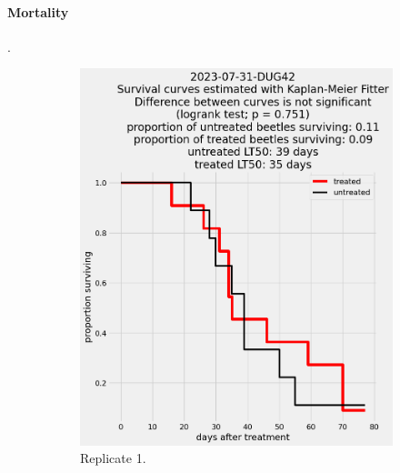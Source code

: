 \documentclass[12pt,letterpaper,english,bibliography=totocnumbered, abstract=on]{scrartcl}
\begin{document}
\paragraph{Mortality}.


\begin{figure}[h]
	\centering
	\begin{subfigure}{.3\textwidth}
		\includegraphics[width=\linewidth]{images/survival_curves/2023-07-31-DUG42}
		\caption{Replicate 1.}
	\end{subfigure}
	\begin{subfigure}{.3\textwidth}

\end{subfigure}
\end{figure}
\end{document}
